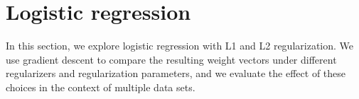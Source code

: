 \documentclass{article}
\begin{document}

\section{Logistic regression}
In this section, we explore logistic regression with L1 and L2 regularization. We use gradient descent to compare the resulting weight vectors under different regularizers and regularization parameters, and we evaluate the effect of these choices in the context of multiple data sets.
\end{document}
